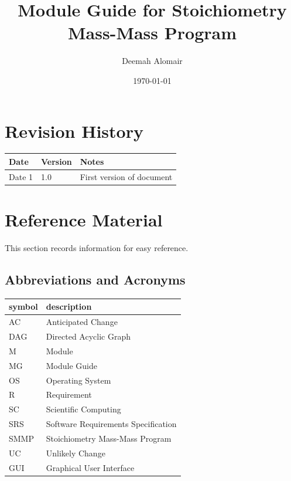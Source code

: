\documentclass[12pt, titlepage]{article}
\begin{document}
\title{Module Guide for Stoichiometry Mass-Mass Program} 
\author{Deemah Alomair}
\date{\today}

\maketitle


\section{Revision History}

\begin{tabularx}{\textwidth}{p{3cm}p{2cm}X}
\toprule {\bf Date} & {\bf Version} & {\bf Notes}\\
\midrule
Date 1 & 1.0 & First version of document\\

\bottomrule
\end{tabularx}

\newpage

\section{Reference Material}

This section records information for easy reference.

\subsection{Abbreviations and Acronyms}

\renewcommand{\arraystretch}{1.2}
\begin{tabular}{l l} 
  \toprule		
  \textbf{symbol} & \textbf{description}\\
  \midrule 
  AC & Anticipated Change\\
  DAG & Directed Acyclic Graph \\
  M & Module \\
  MG & Module Guide \\
  OS & Operating System \\
  R & Requirement\\
  SC & Scientific Computing \\
  SRS & Software Requirements Specification\\
  SMMP & Stoichiometry Mass-Mass Program\\
  UC & Unlikely Change \\
  GUI & Graphical User Interface \\
  \bottomrule
\end{tabular}\\
\end{document}
